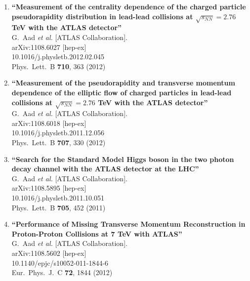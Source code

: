 \documentclass{article}
\begin{document}
\begin{enumerate}
\item%
{\bf ``Measurement of the centrality dependence of the charged particle pseudorapidity distribution in lead-lead collisions at $\sqrt{s_{NN}}=2.76$ TeV with the ATLAS detector''}
  \\{}G.~Aad {\it et al.}  [ATLAS Collaboration].
  \\{}arXiv:1108.6027 [hep-ex]
    \\{}10.1016/j.physletb.2012.02.045
\\{}Phys.\ Lett.\ B {\bf 710}, 363 (2012) %


\item%
{\bf ``Measurement of the pseudorapidity and transverse momentum dependence of the elliptic flow of charged particles in lead-lead collisions at $\sqrt{s_{NN}}=2.76$ TeV with the ATLAS detector''}
  \\{}G.~Aad {\it et al.}  [ATLAS Collaboration].
  \\{}arXiv:1108.6018 [hep-ex]
    \\{}10.1016/j.physletb.2011.12.056
\\{}Phys.\ Lett.\ B {\bf 707}, 330 (2012) %


\item%
{\bf ``Search for the Standard Model Higgs boson in the two photon decay channel with the ATLAS detector at the LHC''}
  \\{}G.~Aad {\it et al.}  [ATLAS Collaboration].
  \\{}arXiv:1108.5895 [hep-ex]
    \\{}10.1016/j.physletb.2011.10.051
\\{}Phys.\ Lett.\ B {\bf 705}, 452 (2011) %


\item%
{\bf ``Performance of Missing Transverse Momentum Reconstruction in Proton-Proton Collisions at 7 TeV with ATLAS''}
  \\{}G.~Aad {\it et al.}  [ATLAS Collaboration].
  \\{}arXiv:1108.5602 [hep-ex]
    \\{}10.1140/epjc/s10052-011-1844-6
\\{}Eur.\ Phys.\ J.\ C {\bf 72}, 1844 (2012) %



\end{enumerate}
\end{document}
